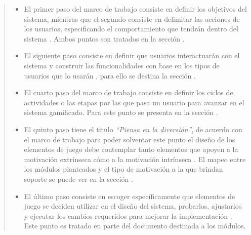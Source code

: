     \begin{quote}
    \begin{itemize}
    \item El primer paso del marco de trabajo consiste en definir los objetivos del
          sistema, mientras que el segundo consiste en delimitar las acciones de los
          usuarios, especificando el comportamiento que tendrán dentro del sistema
          \cite[p. 61, 63]{ForTheWin}. Ambos puntos son tratados en la sección .\\

    \item El siguiente paso consiste en definir que usuarios interactuarán con el sistema
          y construir las funcionalidades con base en los tipos de usuarios que lo
          usarán \cite[p. 64]{ForTheWin}, para ello se destina la sección .\\

    \item El cuarto paso del marco de trabajo consiste en definir los ciclos de actividades
          o las etapas por las que pasa un usuario para avanzar en el sistema gamificado.
          \cite[p. 66]{ForTheWin}
          Para este punto se presenta en la sección .\\

    \item El quinto paso tiene el titulo {\it``Piensa en la diversión''}, de acuerdo con el
          marco de trabajo para poder solventar este punto el diseño de los elementos de
          juego debe contemplar tanto elementos que apoyen a la motivación extrínseca cómo
          a la motivación intrínseca \cite[p. 68]{ForTheWin}. El mapeo entre los módulos
          planteados y el tipo de motivación a la que brindan soporte se puede ver en la
          sección .\\

    \item El último paso consiste en escoger específicamente que elementos de juego se
          deciden utilizar en el diseño del sistema, probarlos, ajustarlos y ejecutar
          los cambios requeridos para mejorar la implementación \cite[p. 69]{ForTheWin}.
          Este punto es tratado en parte del documento destinada a los módulos.
    \end{itemize}
    \end{quote}
